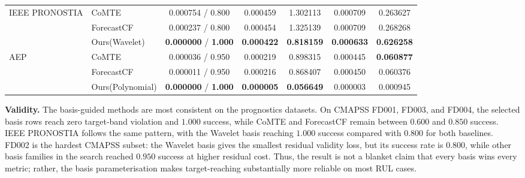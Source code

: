 \documentclass[runningheads]{llncs}
\begin{document}
\begin{table}[htbp]
{\begin{tabular}{llccccc}
				\multirow{3}{*}{IEEE PRONOSTIA}
				& CoMTE       & 0.000754 / 0.800 & 0.000459 & 1.302113 & 0.000709 & 0.263627 \\
				& ForecastCF  & 0.000237 / 0.800 & 0.000454 & 1.325139 & 0.000709 & 0.268268 \\
				& Ours(Wavelet)     & \textbf{0.000000} / \textbf{1.000} & \textbf{0.000422} & \textbf{0.818159} & \textbf{0.000633} & \textbf{0.626258} \\
				\midrule
				
				\multirow{3}{*}{AEP}
				& CoMTE       & 0.000036 / 0.950 & 0.000219 & 0.898315 & 0.000445 & \textbf{0.060877} \\
				& ForecastCF  & 0.000011 / 0.950 & 0.000216 & 0.868407 & 0.000450 & 0.060376 \\
				& Ours(Polynomial)  & \textbf{0.000000} / \textbf{1.000} & \textbf{0.000005} & \textbf{0.056649} & 0.000003 & 0.000945 \\
				\bottomrule
			\end{tabular}
		}
		
	\end{table}
	
	\noindent\textbf{Validity.} The basis-guided methods are most consistent on the prognostics datasets. On CMAPSS FD001, FD003, and FD004, the selected basis rows reach zero target-band violation and $1.000$ success, while CoMTE and ForecastCF remain between $0.600$ and $0.850$ success. IEEE PRONOSTIA follows the same pattern, with the Wavelet basis reaching $1.000$ success compared with $0.800$ for both baselines. FD002 is the hardest CMAPSS subset: the Wavelet basis gives the smallest residual validity loss, but its success rate is $0.800$, while other basis families in the search reached $0.950$ success at higher residual cost. Thus, the result is not a blanket claim that every basis wins every metric; rather, the basis parameterisation makes target-reaching substantially more reliable on most RUL cases.
	
\end{document}
